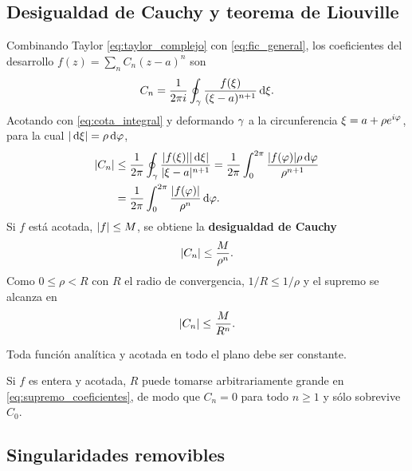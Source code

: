 \subsection{Desigualdad de Cauchy y teorema de Liouville}
\label{subsec:liouville}

Combinando Taylor \eqref{eq:taylor_complejo} con \eqref{eq:fic_general}, los
coeficientes del desarrollo $f(z)=\sum_n C_n(z-a)^n$ son
\begin{equation}
  \label{eq:coeficientes_fic}
  C_n=\frac{1}{2\pi i}\oint_{\gamma}
    \frac{f(\xi)}{(\xi-a)^{n+1}}\,\mathrm{d}\xi .
\end{equation}
Acotando con \eqref{eq:cota_integral} y deformando $\gamma$ a la circunferencia
$\xi=a+\rho e^{i\varphi}$, para la cual $\lvert \,\mathrm{d}\xi \rvert=\rho\,\mathrm{d}\varphi$,
\begin{equation}
  \label{eq:cota_coeficientes}
  \begin{aligned}
    \lvert C_n \rvert
      &\le\frac{1}{2\pi}\oint_{\gamma}
        \frac{\lvert f(\xi) \rvert\lvert \,\mathrm{d}\xi \rvert}{\lvert \xi-a \rvert^{n+1}}
       =\frac{1}{2\pi}\int_{0}^{2\pi}
        \frac{\lvert f(\varphi) \rvert\rho\,\mathrm{d}\varphi}{\rho^{n+1}}\\
      &=\frac{1}{2\pi}\int_{0}^{2\pi}
        \frac{\lvert f(\varphi) \rvert}{\rho^{n}}\,\mathrm{d}\varphi .
  \end{aligned}
\end{equation}
Si $f$ est\'a acotada, $\lvert f \rvert\le M$, se obtiene la
\textbf{desigualdad de Cauchy}
\begin{equation}
  \label{eq:desigualdad_cauchy}
  \lvert C_n \rvert\le\frac{M}{\rho^{n}} .
\end{equation}
Como $0\le\rho<R$ con $R$ el radio de convergencia, $1/R\le 1/\rho$ y el
supremo se alcanza en
\begin{equation}
  \label{eq:supremo_coeficientes}
  \lvert C_n \rvert\le\frac{M}{R^{n}} .
\end{equation}

\begin{teorema}[Liouville]
  \label{teo:liouville}
  Toda funci\'on anal\'itica y acotada en todo el plano debe ser constante.
\end{teorema}

\begin{demostracion}
  Si $f$ es entera y acotada, $R$ puede tomarse arbitrariamente grande en
  \eqref{eq:supremo_coeficientes}, de modo que $C_n=0$ para todo $n\ge 1$ y
  s\'olo sobrevive $C_0$.
\end{demostracion}

\subsection{Singularidades removibles}
\label{subsec:singularidades_removibles}

